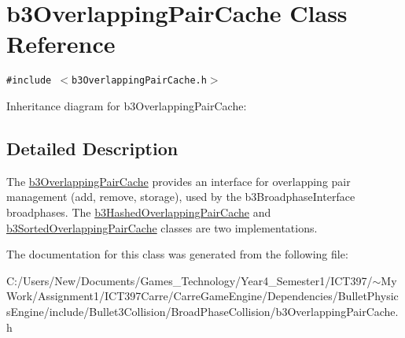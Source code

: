 \hypertarget{classb3_overlapping_pair_cache}{
\section{b3OverlappingPairCache Class Reference}
\label{classb3_overlapping_pair_cache}
}
{\tt \#include $<$b3OverlappingPairCache.h$>$}

Inheritance diagram for b3OverlappingPairCache:

\subsection{Detailed Description}
The \hyperlink{classb3_overlapping_pair_cache}{b3OverlappingPairCache} provides an interface for overlapping pair management (add, remove, storage), used by the b3BroadphaseInterface broadphases. The \hyperlink{classb3_hashed_overlapping_pair_cache}{b3HashedOverlappingPairCache} and \hyperlink{classb3_sorted_overlapping_pair_cache}{b3SortedOverlappingPairCache} classes are two implementations. 

The documentation for this class was generated from the following file:\begin{CompactItemize}
\item 
C:/Users/New/Documents/Games\_\-Technology/Year4\_\-Semester1/ICT397/$\sim$My Work/Assignment1/ICT397Carre/CarreGameEngine/Dependencies/BulletPhysicsEngine/include/Bullet3Collision/BroadPhaseCollision/b3OverlappingPairCache.h\end{CompactItemize}
